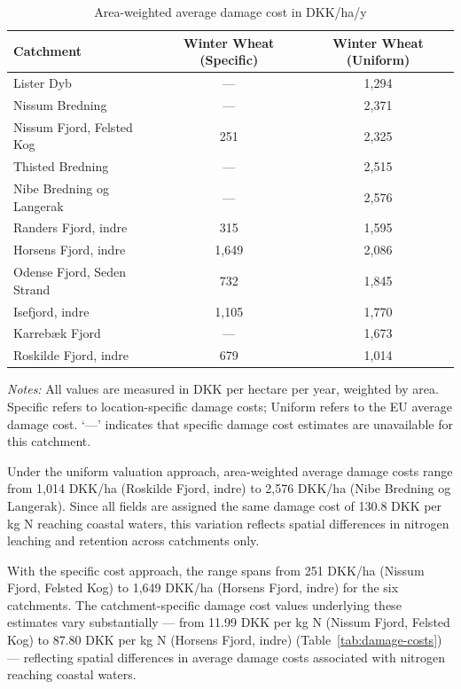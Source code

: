 \documentclass[12pt]{article}
\begin{document}
\begin{table}[H]
\centering
\small
\caption{Area-weighted average damage cost in DKK/ha/y}
\label{tab:damage_costs_all}
\begin{tabular}{lcc}
\toprule
\textbf{Catchment} & \textbf{Winter Wheat (Specific)} & \textbf{Winter Wheat (Uniform)} \\
\midrule
Lister Dyb                    & ---     & 1,294 \\
Nissum Bredning               & ---     & 2,371 \\
Nissum Fjord, Felsted Kog     & 251   & 2,325 \\
Thisted Bredning              & ---     & 2,515 \\
Nibe Bredning og Langerak     & ---     & 2,576 \\
Randers Fjord, indre          & 315   & 1,595 \\
Horsens Fjord, indre          & 1,649 & 2,086 \\
Odense Fjord, Seden Strand    & 732   & 1,845 \\
Isefjord, indre               & 1,105 & 1,770 \\
Karrebæk Fjord                & ---     & 1,673 \\
Roskilde Fjord, indre         & 679   & 1,014 \\
\bottomrule
\end{tabular}
\begin{tablenotes}
\footnotesize
\item \textit{Notes:} All values are measured in DKK per hectare per year, weighted by
area. Specific refers to location-specific damage costs; Uniform refers to the EU
average damage cost. `---' indicates that specific damage cost estimates are
unavailable for this catchment.
\end{tablenotes}
\end{table}


Under the uniform valuation approach, area-weighted average damage costs range from 1,014 DKK/ha (Roskilde Fjord, indre) to 2,576 DKK/ha (Nibe Bredning og Langerak). Since all fields are assigned the same damage cost of 130.8 DKK per kg N reaching coastal waters, this variation reflects spatial differences in nitrogen leaching and retention across catchments only.

With the specific cost approach, the range spans from 251 DKK/ha (Nissum Fjord, Felsted Kog) to 1,649 DKK/ha (Horsens Fjord, indre) for the six catchments. The catchment-specific damage cost values underlying these estimates vary substantially --- from 11.99 DKK per kg N (Nissum Fjord, Felsted Kog) to 87.80 DKK per kg N (Horsens Fjord, indre) (Table~\ref{tab:damage-costs}) --- reflecting spatial differences in average damage costs associated with nitrogen reaching coastal waters.
\end{document}
